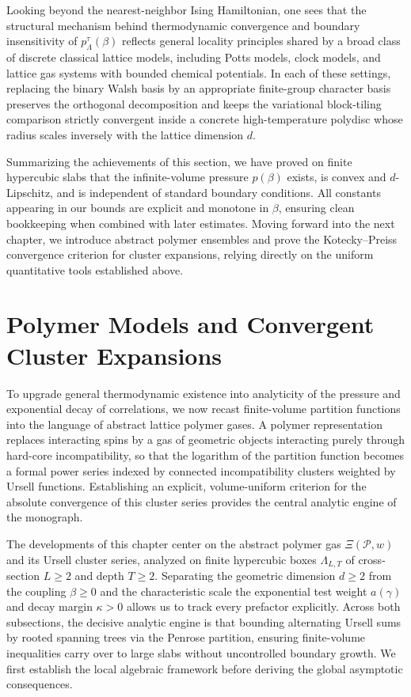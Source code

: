 \documentclass[11pt]{article}
\theoremstyle{definition}
\begin{document}
Looking beyond the nearest-neighbor Ising Hamiltonian, one sees that the structural
mechanism behind thermodynamic convergence and boundary insensitivity of
$p_\Lambda^\tau(\beta)$ reflects general locality principles shared by a broad class
of discrete classical lattice models, including Potts models, clock models, and
lattice gas systems with bounded chemical potentials. In each of these settings,
replacing the binary Walsh basis by an appropriate finite-group character basis
preserves the orthogonal decomposition and keeps the variational block-tiling
comparison strictly convergent inside a concrete high-temperature polydisc whose
radius scales inversely with the lattice dimension $d$.

Summarizing the achievements of this section, we have proved on finite hypercubic
slabs that the infinite-volume pressure $p(\beta)$ exists, is convex and
$d$-Lipschitz, and is independent of standard boundary conditions. All constants
appearing in our bounds are explicit and monotone in $\beta$, ensuring clean
bookkeeping when combined with later estimates. Moving forward into the next
chapter, we introduce abstract polymer ensembles and prove the Kotecky--Preiss
convergence criterion for cluster expansions, relying directly on the uniform
quantitative tools established above.

\section{Polymer Models and Convergent Cluster Expansions}
\label{sec:s03}

To upgrade general thermodynamic existence into analyticity of the pressure and
exponential decay of correlations, we now recast finite-volume partition functions
into the language of abstract lattice polymer gases. A polymer representation
replaces interacting spins by a gas of geometric objects interacting purely through
hard-core incompatibility, so that the logarithm of the partition function becomes a
formal power series indexed by connected incompatibility clusters weighted by Ursell
functions. Establishing an explicit, volume-uniform criterion for the absolute
convergence of this cluster series provides the central analytic engine of the
monograph.

The developments of this chapter center on the abstract polymer gas
$\Xi(\mathcal{P}, w)$ and its Ursell cluster series, analyzed on finite hypercubic
boxes $\Lambda_{L,T}$ of cross-section $L \ge 2$ and depth $T \ge 2$. Separating the
geometric dimension $d \ge 2$ from the coupling $\beta \ge 0$ and the characteristic
scale the exponential test weight $a(\gamma)$ and decay margin $\kappa > 0$ allows
us to track every prefactor explicitly. Across both subsections, the decisive
analytic engine is that bounding alternating Ursell sums by rooted spanning trees
via the Penrose partition, ensuring finite-volume inequalities carry over to large
slabs without uncontrolled boundary growth. We first establish the local algebraic
framework before deriving the global asymptotic consequences.
\end{document}
